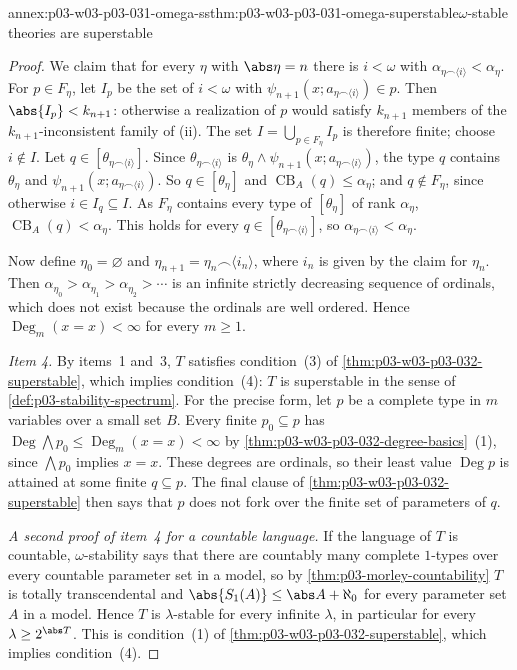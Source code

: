 \begin{annexitem}{annex:p03-w03-p03-031-omega-ss}{thm:p03-w03-p03-031-omega-superstable}{\(\omega\)-stable theories are superstable}
\begin{proof}
We claim that for every \(\eta\) with \(\abs\eta=n\) there is \(i<\omega\)
with \(\alpha_{\eta\frown\langle i\rangle}<\alpha_\eta\).  For
\(p\in F_\eta\), let \(I_p\) be the set of \(i<\omega\) with
\(\psi_{n+1}(x;a_{\eta\frown\langle i\rangle})\in p\).  Then
\(\abs{I_p}<k_{n+1}\): otherwise a realization of \(p\) would satisfy
\(k_{n+1}\) members of the \(k_{n+1}\)-inconsistent family of (ii).  The set
\(I=\bigcup_{p\in F_\eta}I_p\) is therefore finite; choose \(i\notin I\).
Let \(q\in[\theta_{\eta\frown\langle i\rangle}]\).  Since
\(\theta_{\eta\frown\langle i\rangle}\) is
\(\theta_\eta\wedge\psi_{n+1}(x;a_{\eta\frown\langle i\rangle})\), the type
\(q\) contains \(\theta_\eta\) and
\(\psi_{n+1}(x;a_{\eta\frown\langle i\rangle})\).  So \(q\in[\theta_\eta]\)
and \(\operatorname{CB}_A(q)\leq\alpha_\eta\); and \(q\notin F_\eta\), since
otherwise \(i\in I_q\subseteq I\).  As \(F_\eta\) contains every type of
\([\theta_\eta]\) of rank \(\alpha_\eta\),
\(\operatorname{CB}_A(q)<\alpha_\eta\).  This holds for every
\(q\in[\theta_{\eta\frown\langle i\rangle}]\), so
\(\alpha_{\eta\frown\langle i\rangle}<\alpha_\eta\).

Now define \(\eta_0=\varnothing\) and
\(\eta_{n+1}=\eta_n\frown\langle i_n\rangle\), where \(i_n\) is given by the
claim for \(\eta_n\).  Then
\(\alpha_{\eta_0}>\alpha_{\eta_1}>\alpha_{\eta_2}>\cdots\) is an infinite
strictly decreasing sequence of ordinals, which does not exist because the
ordinals are well ordered.  Hence \(\operatorname{Deg}_m(x=x)<\infty\) for
every \(m\geq1\).

\emph{Item 4.}  By items~1 and~3, \(T\) satisfies condition~(3) of
\cref{thm:p03-w03-p03-032-superstable}, which implies condition~(4):
\(T\) is superstable in the sense of \cref{def:p03-stability-spectrum}.
For the precise form, let \(p\) be a complete type in \(m\) variables over a
small set \(B\).  Every finite \(p_0\subseteq p\) has
\(\operatorname{Deg}\bigwedge p_0\leq\operatorname{Deg}_m(x=x)<\infty\) by
\cref{thm:p03-w03-p03-032-degree-basics}~(1), since \(\bigwedge p_0\)
implies \(x=x\).  These degrees are ordinals, so their least value
\(\operatorname{Deg}p\) is attained at some finite \(q\subseteq p\).  The
final clause of \cref{thm:p03-w03-p03-032-superstable} then says that \(p\)
does not fork over the finite set of parameters of \(q\).

\emph{A second proof of item~4 for a countable language.}  If the language
of \(T\) is countable, \(\omega\)-stability says that there are countably
many complete \(1\)-types over every countable parameter set in a model, so
by \cref{thm:p03-morley-countability} \(T\) is totally transcendental and
\(\abs{S_1(A)}\leq\abs A+\aleph_0\) for every parameter set \(A\) in a
model.  Hence \(T\) is \(\lambda\)-stable for every infinite \(\lambda\),
in particular for every \(\lambda\geq2^{\abs T}\).  This is condition~(1)
of \cref{thm:p03-w03-p03-032-superstable}, which implies condition~(4).
\end{proof}
\end{annexitem}


